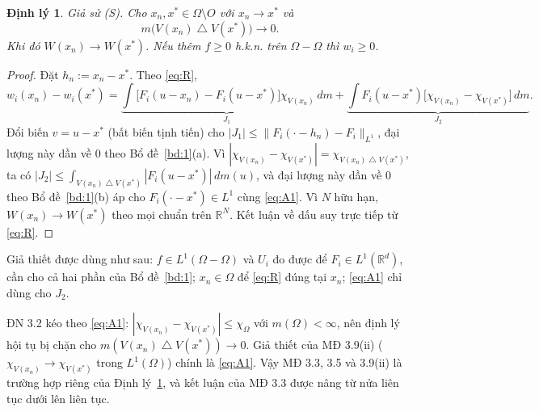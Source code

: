 \documentclass[12pt,a4paper]{article}
\theoremstyle{plain}
\newtheorem{kq}{Định lý}
\theoremstyle{definition}
\newcommand{\R}{\mathbb{R}}
\newcommand{\sd}{\mathbin{\triangle}}
\newcommand{\dm}{\,dm}
\begin{document}
\begin{kq}\label{kq:A}
Giả sử (S). Cho $x_n,x^*\in\Omega\setminus O$ với $x_n\to x^*$ và
\begin{equation}\label{eq:A1}
m\big(V(x_n)\sd V(x^*)\big)\to0 .
\end{equation}
Khi đó $W(x_n)\to W(x^*)$. Nếu thêm $f\ge0$ h.k.n. trên $\Omega-\Omega$ thì $w_i\ge0$.
\end{kq}
\begin{proof}
Đặt $h_n:=x_n-x^*$. Theo \eqref{eq:R},
\[
w_i(x_n)-w_i(x^*)=\underbrace{\int\big[F_i(u-x_n)-F_i(u-x^*)\big]\chi_{V(x_n)}\dm}_{J_1}
+\underbrace{\int F_i(u-x^*)\big[\chi_{V(x_n)}-\chi_{V(x^*)}\big]\dm}_{J_2}.
\]
Đổi biến $v=u-x^*$ (bất biến tịnh tiến) cho $|J_1|\le\|F_i(\cdot-h_n)-F_i\|_{L^1}$, đại lượng này dần về $0$ theo Bổ đề~\ref{bd:1}(a). Vì $|\chi_{V(x_n)}-\chi_{V(x^*)}|=\chi_{V(x_n)\sd V(x^*)}$, ta có $|J_2|\le\int_{V(x_n)\sd V(x^*)}|F_i(u-x^*)|\dm(u)$, và đại lượng này dần về $0$ theo Bổ đề~\ref{bd:1}(b) áp cho $F_i(\cdot-x^*)\in L^1$ cùng \eqref{eq:A1}. Vì $N$ hữu hạn, $W(x_n)\to W(x^*)$ theo mọi chuẩn trên $\R^N$. Kết luận về dấu suy trực tiếp từ \eqref{eq:R}.
\end{proof}

Giả thiết được dùng như sau: $f\in L^1(\Omega-\Omega)$ và $U_i$ đo được để $F_i\in L^1(\R^d)$, cần cho cả hai phần của Bổ đề~\ref{bd:1}; $x_n\in\Omega$ để \eqref{eq:R} đúng tại $x_n$; \eqref{eq:A1} chỉ dùng cho $J_2$.

ĐN 3.2 kéo theo \eqref{eq:A1}: $|\chi_{V(x_n)}-\chi_{V(x^*)}|\le\chi_\Omega$ với $m(\Omega)<\infty$, nên định lý hội tụ bị chặn cho $m(V(x_n)\sd V(x^*))\to0$. Giả thiết của MĐ 3.9(ii) ($\chi_{V(x_n)}\to\chi_{V(x^*)}$ trong $L^1(\Omega)$) chính là \eqref{eq:A1}. Vậy MĐ 3.3, 3.5 và 3.9(ii) là trường hợp riêng của Định lý~\ref{kq:A}, và kết luận của MĐ 3.3 được nâng từ nửa liên tục dưới lên liên tục.
\end{document}
